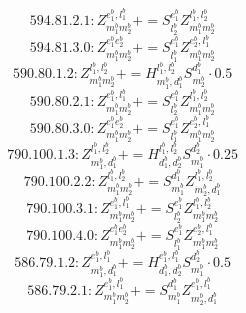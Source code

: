 \documentclass[letterpaper,10pt,fleqn,leqno,onecolumn]{article}
\begin{document}
\begin{equation} \;\;\;\;\;\;  594.81.2.1: Z^{e_{1}^{b},l_{1}^{b}}_{m_{1}^{b}m_{2}^{b}}+=S^{e_{1}^{b}}_{l_{2}^{b}}Z^{l_{1}^{b},l_{2}^{b}}_{m_{1}^{b}m_{2}^{b}} \end{equation}
\begin{equation} \;\;\;\;\;\;  594.81.3.0: Z^{e_{1}^{b}e_{2}^{b}}_{m_{1}^{b}m_{2}^{b}}+=S^{e_{1}^{b}}_{l_{1}^{b}}Z^{e_{2}^{b},l_{1}^{b}}_{m_{1}^{b}m_{2}^{b}} \end{equation}
\begin{equation} \;\;\;\;\;\;  590.80.1.2: Z^{l_{1}^{b},l_{2}^{b}}_{m_{1}^{b}m_{2}^{b}}+=H^{l_{1}^{b},l_{2}^{b}}_{m_{1}^{b},d_{1}^{b}}S^{d_{1}^{b}}_{m_{2}^{b}}\cdot 0.5 \end{equation}
\begin{equation} \;\;\;\;\;\;  590.80.2.1: Z^{e_{1}^{b},l_{1}^{b}}_{m_{1}^{b}m_{2}^{b}}+=S^{e_{1}^{b}}_{l_{2}^{b}}Z^{l_{1}^{b},l_{2}^{b}}_{m_{1}^{b}m_{2}^{b}} \end{equation}
\begin{equation} \;\;\;\;\;\;  590.80.3.0: Z^{e_{1}^{b}e_{2}^{b}}_{m_{1}^{b}m_{2}^{b}}+=S^{e_{1}^{b}}_{l_{1}^{b}}Z^{e_{2}^{b},l_{1}^{b}}_{m_{1}^{b}m_{2}^{b}} \end{equation}
\begin{equation} \;\;\;\;\;\;  790.100.1.3: Z^{l_{1}^{b},l_{2}^{b}}_{m_{1}^{b},d_{1}^{b}}+=H^{l_{1}^{b},l_{2}^{b}}_{d_{1}^{b},d_{2}^{b}}S^{d_{2}^{b}}_{m_{1}^{b}}\cdot 0.25 \end{equation}
\begin{equation} \;\;\;\;\;\;  790.100.2.2: Z^{l_{1}^{b},l_{2}^{b}}_{m_{1}^{b}m_{2}^{b}}+=S^{d_{1}^{b}}_{m_{1}^{b}}Z^{l_{1}^{b},l_{2}^{b}}_{m_{2}^{b},d_{1}^{b}} \end{equation}
\begin{equation} \;\;\;\;\;\;  790.100.3.1: Z^{e_{1}^{b},l_{1}^{b}}_{m_{1}^{b}m_{2}^{b}}+=S^{e_{1}^{b}}_{l_{2}^{b}}Z^{l_{1}^{b},l_{2}^{b}}_{m_{1}^{b}m_{2}^{b}} \end{equation}
\begin{equation} \;\;\;\;\;\;  790.100.4.0: Z^{e_{1}^{b}e_{2}^{b}}_{m_{1}^{b}m_{2}^{b}}+=S^{e_{1}^{b}}_{l_{1}^{b}}Z^{e_{2}^{b},l_{1}^{b}}_{m_{1}^{b}m_{2}^{b}} \end{equation}
\begin{equation} \;\;\;\;\;\;  586.79.1.2: Z^{e_{1}^{b},l_{1}^{b}}_{m_{1}^{b},d_{1}^{b}}+=H^{e_{1}^{b},l_{1}^{b}}_{d_{1}^{b},d_{2}^{b}}S^{d_{2}^{b}}_{m_{1}^{b}}\cdot 0.5 \end{equation}
\begin{equation} \;\;\;\;\;\;  586.79.2.1: Z^{e_{1}^{b},l_{1}^{b}}_{m_{1}^{b}m_{2}^{b}}+=S^{d_{1}^{b}}_{m_{1}^{b}}Z^{e_{1}^{b},l_{1}^{b}}_{m_{2}^{b},d_{1}^{b}} \end{equation}
\end{document}
